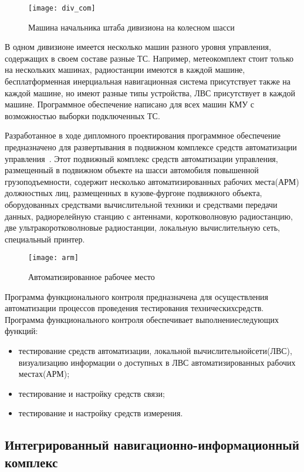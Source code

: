 \begin{figure}[ht]
	\centering
	\texttt{[image: div\_com]}
	\caption{Машина начальника штаба дивизиона на колесном шасси~\cite{div_car}}
	\label{fig:lit_reiview:analytics:div_com}
\end{figure}
В одном дивизионе имеется несколько машин разного уровня управления, содержащих в своем составе разные ТС.
Например, метеокомплект стоит только на нескольких машинах, радиостанции имеются в каждой машине, бесплатформенная
инерциальная навигационная система присутствует также на каждой машине, но имеют разные типы устройства,
ЛВС присутствует в каждой машине.
Программное обеспечение написано для всех машин КМУ с возможностью выборки подключенных ТС.

Разработанное в ходе дипломного проектирования программное обеспечение предназначено для развертывания в подвижном
комплексе средств автоматизации управления~\cite{patent_2263960}.
Этот подвижный комплекс средств автоматизации управления, размещенный в подвижном объекте на шасси автомобиля повышенной
грузоподъемности, содержит несколько автоматизированных рабочих места(АРМ) должностных лиц, размещенных в кузове-фургоне
подвижного объекта, оборудованных средствами вычислительной техники и средствами передачи данных, радиорелейную станцию
с антеннами, коротковолновую радиостанцию, две ультракоротковолновые радиостанции, локальную вычислительную
сеть, специальный принтер.

\begin{figure}[ht]
	\centering
	\texttt{[image: arm]}
	\caption{Автоматизированное рабочее место~\cite{patent_2263960}}
	\label{fig:lit_reiview:analytics:arm}
\end{figure}

Программа функционального контроля предназначена для осуществления автоматизации процессов проведения тестирования
технических\break средств.
Программа функционального контроля обеспечивает выполнение\break следующих функций:
\begin{itemize}
	\item тестирование средств автоматизации, локальной вычислительной\break сети(ЛВС), визуализацию информации о доступных в ЛВС автоматизированных рабочих местах(АРМ);
	\item тестирование и настройку средств связи;
	\item тестирование и настройку средств измерения.
\end{itemize}

\subsection{Интегрированный навигационно-информационный комплекс}
\label{sub:lit_review:ins}

